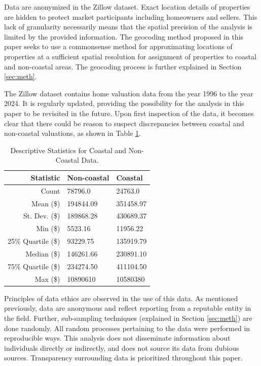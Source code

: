 \documentclass[12pt]{article}
\begin{document}
Data are anonymized in the Zillow dataset. Exact location details of properties are hidden to protect market participants including homeowners and sellers. This lack of granularity necessarily means that the spatial precision of the analysis is limited by the provided information. The geocoding method proposed in this paper seeks to use a commonsense method for approximating locations of properties at a sufficient spatial resolution for assignment of properties to coastal and non-coastal areas. The geocoding process is further explained in Section \ref{sec:meth}.

The Zillow dataset contains home valuation data from the year 1996 to the year 2024. It is regularly updated, providing the possibility for the analysis in this paper to be revisited in the future. Upon first inspection of the data, it becomes clear that there could be reason to suspect discrepancies between coastal and non-coastal valuations, as shown in Table \ref{tab:descriptive_statistics}.

\begin{table}[h]
  \caption{Descriptive Statistics for Coastal and Non-Coastal Data.}
  \label{tab:descriptive_statistics}
  \centering
  \begin{tabular}{rll}
    \toprule
    \textbf{Statistic} & \textbf{Non-coastal} & \textbf{Coastal} \\
    \midrule
    Count & 78796.0 & 24763.0 \\
    Mean (\$) & 194844.09 & 351458.97 \\
    St. Dev. (\$) & 189868.28 & 430689.37 \\
    Min (\$) & 5523.16 & 11956.22 \\
    25\% Quartile (\$) & 93229.75 & 135919.79 \\
    Median (\$) & 146261.66 & 230891.10 \\
    75\% Quartile (\$) & 234274.50 & 411104.50 \\
    Max (\$) & 10890610 & 10580380 \\
    \bottomrule
  \end{tabular}
\end{table}

Principles of data ethics are observed in the use of this data. As mentioned previously, data are anonymous and reflect reporting from a reputable entity in the field. Further, sub-sampling techniques (explained in Section \ref{sec:meth}) are done randomly. All random processes pertaining to the data were performed in reproducible ways. This analysis does not disseminate information about individuals directly or indirectly, and does not source its data from dubious sources. Transparency surrounding data is prioritized throughout this paper.
\end{document}
